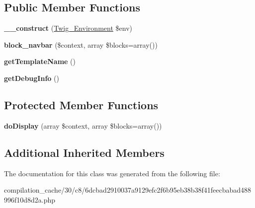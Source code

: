 \subsection*{Public Member Functions}
\begin{DoxyCompactItemize}
\item 
\hypertarget{class_____twig_template__30c86dcbad2910037a9129efc2f6b95eb38b38f41feecbabad488996f10d8d2a_a4f8326243132c1450a81e0a817aa1be7}{}{\bfseries \+\_\+\+\_\+construct} (\hyperlink{class_twig___environment}{Twig\+\_\+\+Environment} \$env)\label{class_____twig_template__30c86dcbad2910037a9129efc2f6b95eb38b38f41feecbabad488996f10d8d2a_a4f8326243132c1450a81e0a817aa1be7}

\item 
\hypertarget{class_____twig_template__30c86dcbad2910037a9129efc2f6b95eb38b38f41feecbabad488996f10d8d2a_a000051b5c5c84ea2f8db09f62e636bd3}{}{\bfseries block\+\_\+navbar} (\$context, array \$blocks=array())\label{class_____twig_template__30c86dcbad2910037a9129efc2f6b95eb38b38f41feecbabad488996f10d8d2a_a000051b5c5c84ea2f8db09f62e636bd3}

\item 
\hypertarget{class_____twig_template__30c86dcbad2910037a9129efc2f6b95eb38b38f41feecbabad488996f10d8d2a_a621a3ccd148ed8b9e937da6959c98f39}{}{\bfseries get\+Template\+Name} ()\label{class_____twig_template__30c86dcbad2910037a9129efc2f6b95eb38b38f41feecbabad488996f10d8d2a_a621a3ccd148ed8b9e937da6959c98f39}

\item 
\hypertarget{class_____twig_template__30c86dcbad2910037a9129efc2f6b95eb38b38f41feecbabad488996f10d8d2a_abd0ecb0136f4228db2bd963bfc1e20d7}{}{\bfseries get\+Debug\+Info} ()\label{class_____twig_template__30c86dcbad2910037a9129efc2f6b95eb38b38f41feecbabad488996f10d8d2a_abd0ecb0136f4228db2bd963bfc1e20d7}

\end{DoxyCompactItemize}
\subsection*{Protected Member Functions}
\begin{DoxyCompactItemize}
\item 
\hypertarget{class_____twig_template__30c86dcbad2910037a9129efc2f6b95eb38b38f41feecbabad488996f10d8d2a_adb62b7c226e07d30f836ed16158d924f}{}{\bfseries do\+Display} (array \$context, array \$blocks=array())\label{class_____twig_template__30c86dcbad2910037a9129efc2f6b95eb38b38f41feecbabad488996f10d8d2a_adb62b7c226e07d30f836ed16158d924f}

\end{DoxyCompactItemize}
\subsection*{Additional Inherited Members}


The documentation for this class was generated from the following file\+:\begin{DoxyCompactItemize}
\item 
compilation\+\_\+cache/30/c8/6dcbad2910037a9129efc2f6b95eb38b38f41feecbabad488996f10d8d2a.\+php\end{DoxyCompactItemize}
